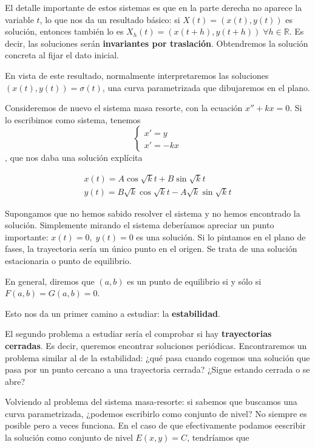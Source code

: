 \documentclass[nochap]{apuntes}
\begin{document}
El detalle importante de estos sistemas es que en la parte derecha no aparece la variable $t$, lo que nos da un resultado básico: si $X(t) = (x(t), y(t))$ es solución, entonces también lo es $X_h(t) = (x(t+h), y(t+h))\; ∀h∈ℝ$. Es decir, las soluciones serán \textbf{invariantes por traslación}. Obtendremos la solución concreta al fijar el dato inicial.

En vista de este resultado, normalmente interpretaremos las soluciones $(x(t), y(t)) = σ(t)$, una curva parametrizada que dibujaremos en el plano.

Consideremos de nuevo el sistema masa resorte, con la ecuación $x'' +kx = 0$. Si lo escribimos como sistema, tenemos \[ \begin{cases} x' = y \\ x' = -kx \end{cases} \], que nos daba una solución explícita 

\begin{align*}
x(t) = A\cos \sqrt{k}t + B \sin \sqrt{k} t \\
y(t) = B\sqrt{k}\cos \sqrt{k} t - A \sqrt{k}\sin \sqrt{k} t
\end{align*}

Supongamos que no hemos sabido resolver el sistema y no hemos encontrado la solución. Simplemente mirando el sistema deberíamos apreciar un punto importante: $x(t) = 0,\;y(t) = 0$ es una solución. Si lo pintamos en el plano de fases, la trayectoria sería un único punto en el origen. Se trata de una solución estacionaria o punto de equilibrio.

\begin{defn}
En general, diremos que $(a,b)$ es un punto de equilibrio si y sólo si $F(a,b) = G(a,b) = 0$.
\end{defn}

Esto nos da un primer camino a estudiar: la \textbf{estabilidad}. 

El segundo problema a estudiar sería el comprobar si hay \textbf{trayectorias cerradas}. Es decir, queremos encontrar soluciones periódicas. Encontraremos un problema similar al de la estabilidad: ¿qué pasa cuando cogemos una solución que pasa por un punto cercano a una trayectoria cerrada? ¿Sigue estando cerrada o se abre? 

Volviendo al problema del sistema masa-resorte: si sabemos que buscamos una curva parametrizada, ¿podemos escribirlo como conjunto de nivel? No siempre es posible pero a veces funciona. En el caso de que efectivamente podamos eescribir la solución como conjunto de nivel $E(x,y) = C$, tendríamos que
\end{document}
